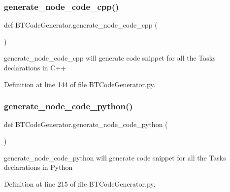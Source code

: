\mbox{\label{namespace_b_t_code_generator_a09267bf563df55b448e406996022b3b1}} 
\subsubsection{\texorpdfstring{generate\_node\_code\_cpp()}{generate\_node\_code\_cpp()}}
{\footnotesize\ttfamily def B\+T\+Code\+Generator.\+generate\+\_\+node\+\_\+code\+\_\+cpp (\begin{DoxyParamCaption}{ }\end{DoxyParamCaption})}



\textquotesingle{}generate\+\_\+node\+\_\+code\+\_\+cpp\textquotesingle{} will generate code snippet for all the Tasks declarations in C++ 



Definition at line 144 of file B\+T\+Code\+Generator.\+py.

\mbox{\label{namespace_b_t_code_generator_a7bea8f87522fb1e2ea09694dd1eae7eb}} 
\subsubsection{\texorpdfstring{generate\_node\_code\_python()}{generate\_node\_code\_python()}}
{\footnotesize\ttfamily def B\+T\+Code\+Generator.\+generate\+\_\+node\+\_\+code\+\_\+python (\begin{DoxyParamCaption}{ }\end{DoxyParamCaption})}



\textquotesingle{}generate\+\_\+node\+\_\+code\+\_\+python\textquotesingle{} will generate code snippet for all the Tasks declarations in Python 



Definition at line 215 of file B\+T\+Code\+Generator.\+py.

\mbox{\label{namespace_b_t_code_generator_af49b1d39052f0122b97e331871bdbd79}} 
